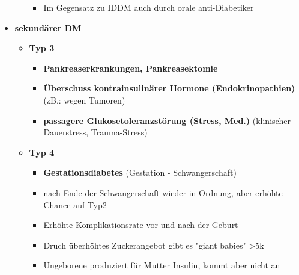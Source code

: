 \begin{itemize}
\begin{itemize}
\begin{itemize}
\begin{itemize}
								\end{itemize}
							\item Im Gegensatz zu IDDM auch durch orale anti-Diabetiker
						\end{itemize}
				\end{itemize}
			\item \textbf{sekundärer DM}
				\begin{itemize}
					\item \textbf{Typ 3}
						\begin{itemize}
							\item \textbf{Pankreaserkrankungen, Pankreasektomie}
							\item \textbf{Überschuss kontrainsulinärer Hormone (Endokrinopathien)} (zB.: wegen Tumoren)
							\item \textbf{passagere Glukosetoleranzstörung (Stress, Med.)} (klinischer Dauerstress, Trauma-Stress)
						\end{itemize}
					\item \textbf{Typ 4}
						\begin{itemize}
							\item \textbf{Gestationsdiabetes} (Gestation - Schwangerschaft)
							\item nach Ende der Schwangerschaft wieder in Ordnung, aber erhöhte Chance auf Typ2
							\item Erhöhte Komplikationsrate vor und nach der Geburt
							\item Druch überhöhtes Zuckerangebot gibt es "giant babies" >5k
							\item Ungeborene produziert für Mutter Insulin, kommt aber nicht an
						\end{itemize}
				\end{itemize}
		\end{itemize}
